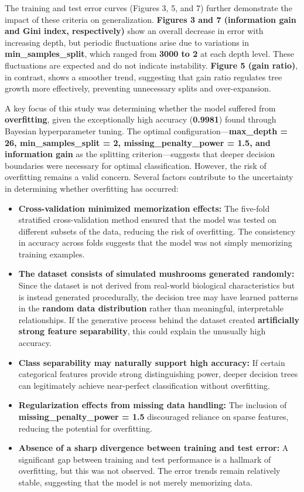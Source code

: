 \documentclass[12pt]{article}
\begin{document}
The training and test error curves (Figures 3, 5, and 7) further demonstrate the impact of these criteria on generalization. \textbf{Figures 3 and 7 (information gain and Gini index, respectively)} show an overall decrease in error with increasing depth, but periodic fluctuations arise due to variations in \textbf{min\_samples\_split}, which ranged from \textbf{3000 to 2} at each depth level. These fluctuations are expected and do not indicate instability. \textbf{Figure 5 (gain ratio)}, in contrast, shows a smoother trend, suggesting that gain ratio regulates tree growth more effectively, preventing unnecessary splits and over-expansion.

A key focus of this study was determining whether the model suffered from \textbf{overfitting}, given the exceptionally high accuracy (\textbf{0.9981}) found through Bayesian hyperparameter tuning. The optimal configuration—\textbf{max\_depth = 26, min\_samples\_split = 2, missing\_penalty\_power = 1.5, and information gain} as the splitting criterion—suggests that deeper decision boundaries were necessary for optimal classification. However, the risk of overfitting remains a valid concern. Several factors contribute to the uncertainty in determining whether overfitting has occurred:

\begin{itemize}
    \item \textbf{Cross-validation minimized memorization effects:} The five-fold stratified cross-validation method ensured that the model was tested on different subsets of the data, reducing the risk of overfitting. The consistency in accuracy across folds suggests that the model was not simply memorizing training examples.
    \item \textbf{The dataset consists of simulated mushrooms generated randomly:} Since the dataset is not derived from real-world biological characteristics but is instead generated procedurally, the decision tree may have learned patterns in the \textbf{random data distribution} rather than meaningful, interpretable relationships. If the generative process behind the dataset created \textbf{artificially strong feature separability}, this could explain the unusually high accuracy.
    \item \textbf{Class separability may naturally support high accuracy:} If certain categorical features provide strong distinguishing power, deeper decision trees can legitimately achieve near-perfect classification without overfitting.
    \item \textbf{Regularization effects from missing data handling:} The inclusion of \textbf{missing\_penalty\_power = 1.5} discouraged reliance on sparse features, reducing the potential for overfitting.
    \item \textbf{Absence of a sharp divergence between training and test error:} A significant gap between training and test performance is a hallmark of overfitting, but this was not observed. The error trends remain relatively stable, suggesting that the model is not merely memorizing data.
\end{itemize}
\end{document}

